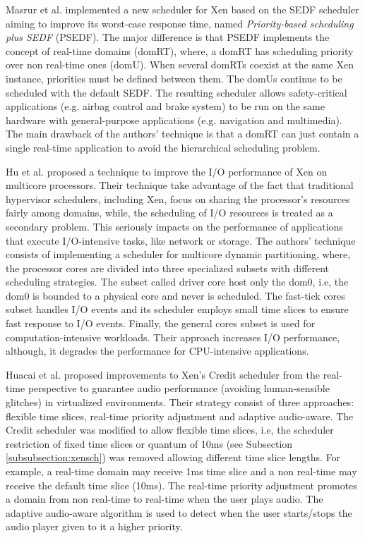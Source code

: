 Masrur et al. \cite{Masrur2010} implemented a new scheduler for Xen based on the SEDF scheduler aiming to improve its worst-case response time, named  \emph{Priority-based scheduling plus SEDF} (PSEDF). The major difference is that PSEDF implements the concept of real-time domains (domRT), where, a domRT has scheduling priority over non real-time ones (domU). When several domRTs coexist at the same Xen instance, priorities must be defined between them. The domUs continue to be scheduled with the default SEDF. The resulting scheduler allows safety-critical applications (e.g. airbag control and brake system) to be run on the same hardware with general-purpose applications (e.g. navigation and multimedia). The main drawback of the authors’ technique is that a domRT can just contain a single real-time application to avoid the hierarchical scheduling problem.

Hu et al. \cite{Hu2010} proposed a technique to improve the I/O performance of Xen on multicore processors. Their technique take advantage of the fact that traditional hypervisor schedulers, including Xen, focus on sharing the processor's resources fairly among domains, while, the scheduling of I/O resources is treated as a secondary problem. This seriously impacts on the performance of applications that execute I/O-intensive tasks, like network or storage. The authors’ technique consists of implementing  a scheduler for multicore dynamic partitioning, where, the processor cores are divided into three specialized subsets with different scheduling strategies. The subset called driver core host only the dom0, i.e, the dom0 is bounded to a physical core and never is scheduled. The fast-tick cores subset handles I/O events and its scheduler employs small time slices to ensure fast response to I/O events. Finally, the general cores subset is used for computation-intensive workloads. Their approach increases I/O performance, although, it degrades the performance for CPU-intensive applications.

Huacai et al. \cite{huacai2010} proposed improvements to Xen's Credit scheduler from the real-time perspective to guarantee audio performance (avoiding human-sensible glitches) in virtualized environments. Their strategy consist of three approaches: flexible time slices, real-time priority adjustment and adaptive audio-aware. The Credit scheduler was modified to allow flexible time slices, i.e, the scheduler restriction of fixed time slices or quantum of 10ms (see Subsection \ref{subsubsection:xensch}) was removed allowing different time slice lengths. For example, a real-time domain may receive 1ms time slice and a non real-time may receive the default time slice (10ms).  The real-time priority adjustment promotes a domain from non real-time to real-time when the user plays audio. The adaptive audio-aware algorithm is used to detect when the user starts/stops the audio player given to it a higher priority. 

